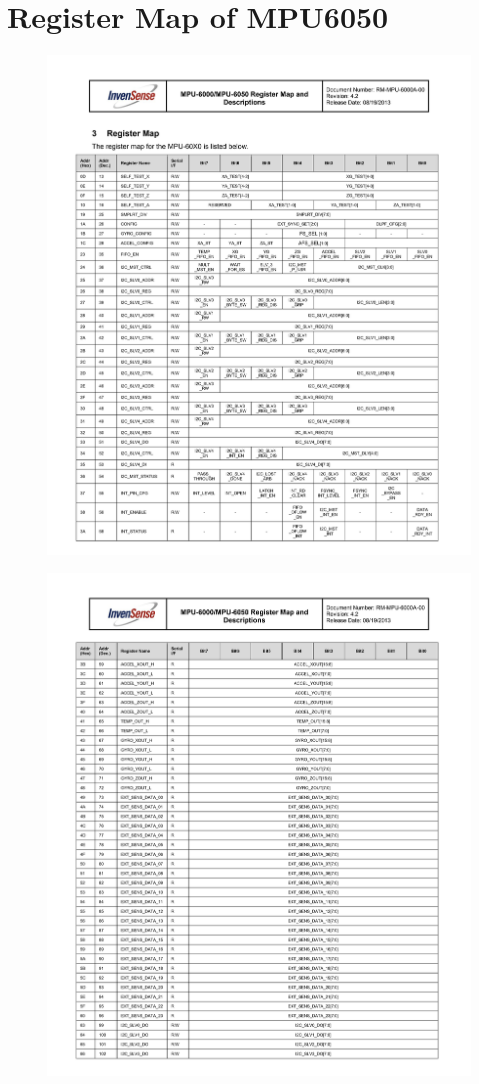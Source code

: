 \documentclass[letterpaper,12pt,titlepage,oneside,final]{book}
\begin{document}
\chapter{Register Map of MPU6050}
\begin{figure}[h!]
	\includegraphics{5}
\end{figure} 
\begin{figure}[h!]
	\includegraphics{6}
\end{figure}
\end{document}
